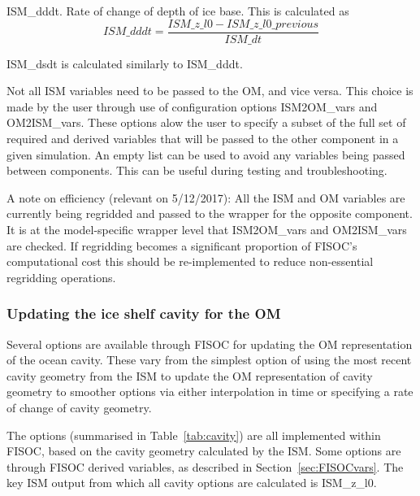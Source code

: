 \documentclass[12pt]{article}
\begin{document}
ISM\_dddt.  Rate of change of depth of ice base.  This is calculated as 
\begin{equation}
ISM\_dddt = \frac{ISM\_z\_l0 - ISM\_z\_l0\_previous}{ISM\_dt}
\end{equation}

ISM\_dsdt is calculated similarly to ISM\_dddt.

Not all ISM variables need to be passed to the OM, and vice versa.  
This choice is made by the 
user through use of configuration options ISM2OM\_vars and OM2ISM\_vars.  
These options alow the user to specify a subset of the full set of 
required and derived variables that will be passed to the other component 
in a given simulation.  An empty list can be used to avoid any variables 
being passed between components.  This can be useful during testing and 
troubleshooting.

A note on efficiency (relevant on 5/12/2017): 
All the ISM and OM variables are currently being regridded and passed 
to the wrapper for the opposite component.  It is at the model-specific 
wrapper level that ISM2OM\_vars and OM2ISM\_vars are checked.  If regridding 
becomes a significant proportion of FISOC's computational cost this 
should be re-implemented to reduce non-essential regridding operations.





\subsubsection{Updating the ice shelf cavity for the OM}

Several options are available through FISOC for updating the OM representation 
of the ocean cavity. 
These vary from the simplest option of using 
the most recent cavity geometry from the ISM to update the OM representation of 
cavity geometry to smoother options via either interpolation in time or 
specifying a rate of change of cavity geometry.

The options (summarised in Table~\ref{tab:cavity}) are all implemented 
within FISOC, based on the cavity geometry 
calculated by the ISM.  
Some options are through FISOC derived variables, as described 
in Section~\ref{sec:FISOCvars}.  
The key ISM output from which all cavity options 
are calculated is ISM\_z\_l0.  
\end{document}
